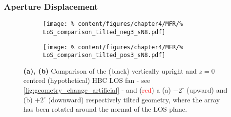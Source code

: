         \subsubsection*{Aperture Displacement}%
%
            \begin{figure}[t]%
                \centering%
                \begin{subfigure}{0.3\textwidth}%
                    \texttt{[image: \%
                        content/figures/chapter4/MFR/\%
                        LoS\_comparison\_tilted\_neg3\_sN8.pdf]}%
                    \caption{}%
                \end{subfigure}%
                \hspace*{0.5cm}%
                \begin{subfigure}{0.3\textwidth}%
                    \texttt{[image: \%
                        content/figures/chapter4/MFR/\%
                        LoS\_comparison\_tilted\_pos3\_sN8.pdf]}%
                    \caption{}%
                \end{subfigure}%
                \caption{\textbf{(a), (b)} Comparison of the (black) vertically upright and $z=0$ centred (hypothetical) HBC LOS fan - see \cref{fig:geometry_change_artificial} - and (\textcolor{red}{red}) a (a) $-2^{\circ}$ (upward) and (b) $+2^{\circ}$ (downward) respectively tilted geometry, where the array has been rotated around the normal of the LOS plane.}\label{fig:geometry_change_tilted}%
            \end{figure}%
%
